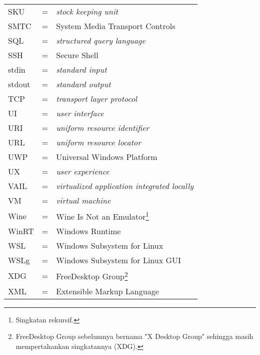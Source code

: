 \begin{longtable}{llp{3in}}
    SKU & \hspace{1.5cm} = & \textit{stock keeping unit}\\
    SMTC & \hspace {1.5cm} = & System Media Transport Controls\\
    SQL & \hspace{1.5cm} = & \textit{structured query language}\\
    SSH & \hspace{1.5cm} = & Secure Shell\\
    stdin & \hspace{1.5cm} = & \textit{standard input}\\
    stdout & \hspace{1.5cm} = & \textit{standard output}\\
    TCP & \hspace{1.5cm} = & \textit{transport layer protocol}\\
    UI & \hspace{1.5cm} = & \textit{user interface}\\
    URI & \hspace{1.5cm} = & \textit{uniform resource identifier}\\
    URL & \hspace{1.5cm} = & \textit{uniform resource locator}\\
    UWP & \hspace{1.5cm} = & Universal Windows Platform\\
    UX & \hspace{1.5cm} = & \textit{user experience}\\
    VAIL & \hspace{1.5cm} = & \textit{virtualized application integrated locally}\\
    VM & \hspace{1.5cm} = & \textit{virtual machine}\\
    Wine & \hspace{1.5cm} = & Wine Is Not an Emulator\footnote{Singkatan rekursif.}\\
    WinRT & \hspace{1.5cm} = & Windows Runtime\\
    WSL & \hspace{1.5cm} = & Windows Subsystem for Linux\\
    WSLg & \hspace{1.5cm} = & Windows Subsystem for Linux GUI\\
    XDG & \hspace{1.5cm} = & FreeDesktop Group\footnote{FreeDesktop Group sebelumnya bernama "X Desktop Group" sehingga masih mempertahankan singkatannya (XDG).}\\
    XML & \hspace{1.5cm} = & Extensible Markup Language
\end{longtable}
